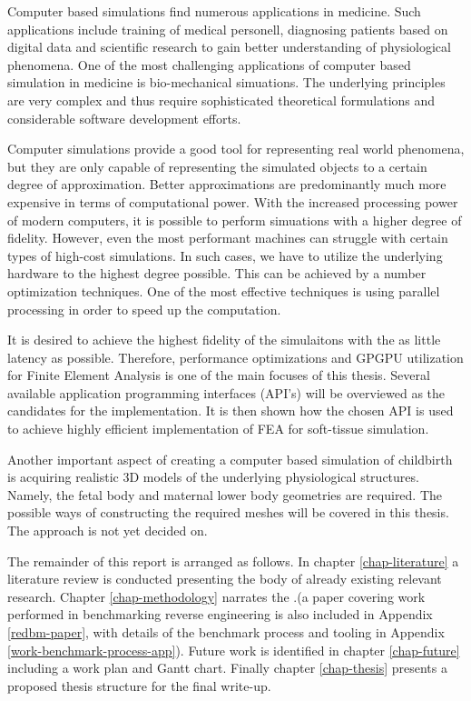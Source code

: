 Computer based simulations find numerous applications in medicine. Such applications include training of medical personell, diagnosing patients based on digital data and scientific research to gain better understanding of physiological phenomena. One of the most challenging applications of computer based simulation in medicine is bio-mechanical simuations. The underlying principles are very complex and thus require sophisticated theoretical formulations and considerable software development efforts.



Computer simulations provide a good tool for representing real world phenomena, but they are only capable of representing the simulated objects to a certain degree of approximation. Better approximations are predominantly much more expensive in terms of computational power. With the increased processing power of modern computers, it is possible to perform simuations with a higher degree of fidelity. However, even the most performant machines can struggle with certain types of high-cost simulations. In such cases, we have to utilize the underlying hardware to the highest degree possible. This can be achieved by a number optimization techniques. One of the most effective techniques is using parallel processing in order to speed up the computation.

It is desired to achieve the highest fidelity of the simulaitons with the as little latency as possible. Therefore, performance optimizations and GPGPU utilization for Finite Element Analysis is one of the main focuses of this thesis. Several available application programming interfaces (API's) will be overviewed as the candidates for the implementation. It is then shown how the chosen API is used to achieve highly efficient implementation of FEA for soft-tissue simulation.

Another important aspect of creating a computer based simulation of childbirth is acquiring realistic 3D models of the underlying physiological structures. Namely, the fetal body and maternal lower body geometries are required. The possible ways of constructing the required meshes will be covered in this thesis. The approach is not yet decided on.

The remainder of this report is arranged as follows. In chapter \ref{chap-literature} a literature review is conducted  presenting the body of already existing relevant research. Chapter \ref{chap-methodology} narrates the .(a paper covering work performed in benchmarking reverse engineering is also included in Appendix \ref{redbm-paper}, with details of the benchmark process and tooling in Appendix \ref{work-benchmark-process-app}). Future work is identified in chapter \ref{chap-future} including a work plan and Gantt chart. Finally chapter \ref{chap-thesis} presents a proposed thesis structure for the final write-up.
